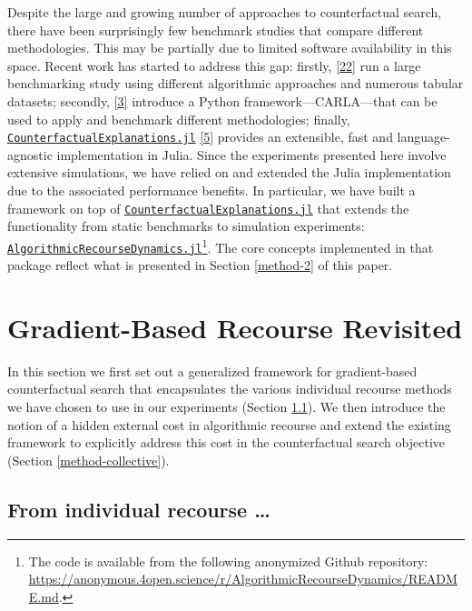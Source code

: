 \documentclass[conference,final,]{IEEEtran}
\theoremstyle{definition}
\theoremstyle{definition}
\theoremstyle{definition}
\theoremstyle{definition}
\theoremstyle{remark}
\begin{document}
Despite the large and growing number of approaches to counterfactual search, there have been surprisingly few benchmark studies that compare different methodologies. This may be partially due to limited software availability in this space. Recent work has started to address this gap: firstly, \protect\hyperlink{ref-deoliveira2021framework}{{[}22{]}} run a large benchmarking study using different algorithmic approaches and numerous tabular datasets; secondly, \protect\hyperlink{ref-pawelczyk2021carla}{{[}3{]}} introduce a Python framework---CARLA---that can be used to apply and benchmark different methodologies; finally, \href{https://github.com/pat-alt/CounterfactualExplanations.jl}{\texttt{CounterfactualExplanations.jl}} \protect\hyperlink{ref-altmeyer2022counterfactualexplanations}{{[}5{]}} provides an extensible, fast and language-agnostic implementation in Julia. Since the experiments presented here involve extensive simulations, we have relied on and extended the Julia implementation due to the associated performance benefits. In particular, we have built a framework on top of \href{https://github.com/pat-alt/CounterfactualExplanations.jl}{\texttt{CounterfactualExplanations.jl}} that extends the functionality from static benchmarks to simulation experiments: \href{(https://anonymous.4open.science/r/AlgorithmicRecourseDynamics/README.md)}{\texttt{AlgorithmicRecourseDynamics.jl}}\footnote{The code is available from the following anonymized Github repository: \url{https://anonymous.4open.science/r/AlgorithmicRecourseDynamics/README.md}.}. The core concepts implemented in that package reflect what is presented in Section \ref{method-2} of this paper.

\hypertarget{method}{%
\section{Gradient-Based Recourse Revisited}\label{method}}

In this section we first set out a generalized framework for gradient-based counterfactual search that encapsulates the various individual recourse methods we have chosen to use in our experiments (Section \ref{method-general}). We then introduce the notion of a hidden external cost in algorithmic recourse and extend the existing framework to explicitly address this cost in the counterfactual search objective (Section \ref{method-collective}).

\hypertarget{method-general}{%
\subsection{From individual recourse \ldots{}}\label{method-general}}
\end{document}
